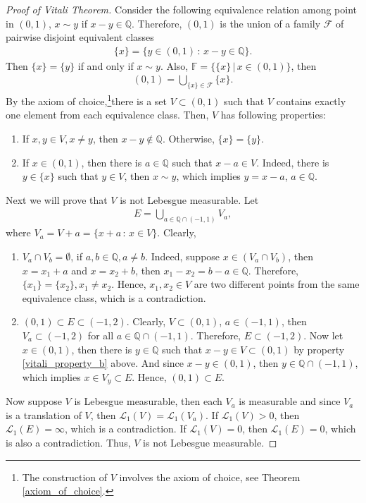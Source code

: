 \documentclass[11pt]{book}
\theoremstyle{definition}
\numberwithin{equation}{chapter}
\def\L{{\mathcal L}}
\begin{document}
\begin{proof}[Proof of Vitali Theorem]
Consider the following equivalence relation among point in $(0,1)$, $x \sim y$ if $x - y \in \mathbb{Q}$. Therefore, $(0,1)$ is the union of a family $\mathcal{F}$ of pairwise disjoint equivalent classes 
\begin{align*}
    \{x\} = \{y \in (0,1)\,:\, x - y \in \mathbb{Q}\}.
\end{align*}
Then $\{x\} = \{y\}$ if and only if $x \sim y$. Also, $\mathbb{F} = \{\{x\}\,|\, x \in (0,1)\}$, then 
\begin{align*}
    (0,1) = \bigcup_{\{x\} \in \mathcal{F}} \{x\}.
\end{align*}
By the axiom of choice,\footnote{The construction of $V$ involves the axiom of choice, see Theorem \ref{axiom_of_choice}.}there is a set $V \subset (0,1)$ such that $V$ contains exactly one element from each equivalence class. Then, $V$ has following properties:
\begin{enumerate}[label=(\alph*)]
    \item If $x,y \in V, x \neq y$, then $x - y \notin \mathbb{Q}$. Otherwise, $\{x\} = \{y\}$.
    
    \item If $x \in (0,1)$, then there is $a \in \mathbb{Q}$ such that $x - a \in V$. Indeed, there is $y \in \{x\}$ such that $y \in V$, then $x \sim y$, which implies $y = x - a$, $a \in \mathbb{Q}$.\label{vitali_property_b}
\end{enumerate}

Next we will prove that $V$ is not Lebesgue measurable. Let
\begin{align*}
    E = \bigcup_{a\in\mathbb{Q}\cap(-1,1)} V_a,
\end{align*}
where $V_a = V + a = \{x+a\,:\, x\in V\}$. Clearly,
\begin{enumerate}[label=(\roman*)]
    \item $V_a \cap V_b = \emptyset$, if $a,b \in \mathbb{Q}, a \neq b$. Indeed, suppose $x \in (V_a \cap V_b)$, then $x = x_1 + a$ and $x = x_2 + b$, then $x_1 - x_2 = b - a \in \mathbb{Q}$. Therefore, $\{x_1\} = \{x_2\}, x_1 \neq x_2$. Hence, $x_1, x_2 \in V$ are two different points from the same equivalence class, which is a contradiction.
    
    \item $(0,1) \subset E \subset (-1,2)$. Clearly, $V \subset (0,1)$, $a \in (-1,1)$, then $V_a \subset (-1,2)$ for all $a \in \mathbb{Q}\cap(-1,1)$. Therefore, $E \subset (-1,2)$. Now let $x \in (0,1)$, then there is $y \in \mathbb{Q}$ such that $x - y \in V \subset (0,1)$ by property \ref{vitali_property_b} above. And since $x - y \in (0,1)$, then $y \in \mathbb{Q} \cap (-1,1)$, which implies $x \in V_y \subset E$. Hence, $(0,1) \subset E$.
\end{enumerate}
Now suppose $V$ is Lebesgue measurable, then each $V_a$ is measurable and since $V_a$ is a translation of $V$, then $\L_1(V) = \L_1(V_a)$. If $\L_1(V) > 0$, then $\L_1(E) = \infty$, which is a contradiction. If $\L_1(V) = 0$, then $\L_1(E) = 0$, which is also a contradiction. Thus, $V$ is not Lebesgue measurable.
\end{proof}
\end{document}
